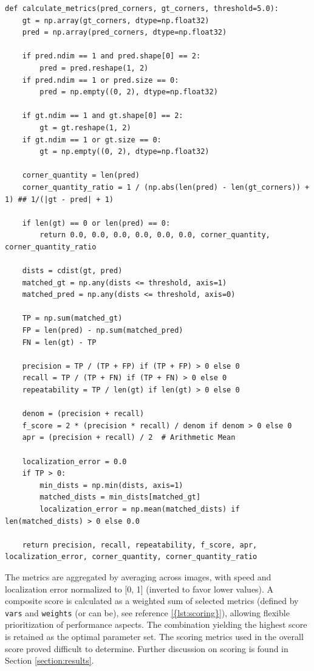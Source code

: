 \documentclass[journal]{IEEEtran}
\begin{document}
\begin{lstlisting}[style=python, caption={Metric Calculations}, label={lst:optimize_across_images}]
def calculate_metrics(pred_corners, gt_corners, threshold=5.0):
    gt = np.array(gt_corners, dtype=np.float32)
    pred = np.array(pred_corners, dtype=np.float32)

    if pred.ndim == 1 and pred.shape[0] == 2:
        pred = pred.reshape(1, 2)
    if pred.ndim == 1 or pred.size == 0:
        pred = np.empty((0, 2), dtype=np.float32)

    if gt.ndim == 1 and gt.shape[0] == 2:
        gt = gt.reshape(1, 2)
    if gt.ndim == 1 or gt.size == 0:
        gt = np.empty((0, 2), dtype=np.float32)

    corner_quantity = len(pred)
    corner_quantity_ratio = 1 / (np.abs(len(pred) - len(gt_corners)) + 1) ## 1/(|gt - pred| + 1)

    if len(gt) == 0 or len(pred) == 0:
        return 0.0, 0.0, 0.0, 0.0, 0.0, 0.0, corner_quantity, corner_quantity_ratio

    dists = cdist(gt, pred)  
    matched_gt = np.any(dists <= threshold, axis=1)
    matched_pred = np.any(dists <= threshold, axis=0)

    TP = np.sum(matched_gt)
    FP = len(pred) - np.sum(matched_pred)
    FN = len(gt) - TP

    precision = TP / (TP + FP) if (TP + FP) > 0 else 0
    recall = TP / (TP + FN) if (TP + FN) > 0 else 0
    repeatability = TP / len(gt) if len(gt) > 0 else 0

    denom = (precision + recall)
    f_score = 2 * (precision * recall) / denom if denom > 0 else 0
    apr = (precision + recall) / 2  # Arithmetic Mean 

    localization_error = 0.0
    if TP > 0:
        min_dists = np.min(dists, axis=1) 
        matched_dists = min_dists[matched_gt] 
        localization_error = np.mean(matched_dists) if len(matched_dists) > 0 else 0.0

    return precision, recall, repeatability, f_score, apr, localization_error, corner_quantity, corner_quantity_ratio
\end{lstlisting}

The metrics are aggregated by averaging across images, with speed and localization error normalized to [0, 1] (inverted to favor lower values). A composite score is calculated as a weighted sum of selected metrics (defined by \texttt{vars} and \texttt{weights} (or can be), see reference \cref{{lst:scoring}}), allowing flexible prioritization of performance aspects. The combination yielding the highest score is retained as the optimal parameter set. The scoring metrics used in the overall score proved difficult to determine. Further discussion on scoring is found in Section \ref{section:results}.\\
\end{document}
